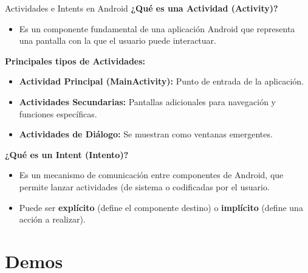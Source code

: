 \documentclass[aspectratio=169,compress]{beamer}
\begin{document}
\begin{frame}{Actividades e Intents en Android}
\textbf{¿Qué es una Actividad (Activity)?}

\begin{itemize}
    \item Es un componente fundamental de una aplicación Android que representa una pantalla con la que el usuario puede interactuar.
\end{itemize}

\vspace{0.4cm}

\textbf{Principales tipos de Actividades:}
\begin{itemize}
    \item \textbf{Actividad Principal (MainActivity):} Punto de entrada de la aplicación.
    \item \textbf{Actividades Secundarias:} Pantallas adicionales para navegación y funciones específicas.
    \item \textbf{Actividades de Diálogo:} Se muestran como ventanas emergentes.
\end{itemize}

\vspace{0.4cm}

\textbf{¿Qué es un Intent (Intento)?}
\begin{itemize}
    \item Es un mecanismo de comunicación entre componentes de Android, que permite lanzar actividades (de sistema o codificadas por el usuario.
    \item Puede ser \textbf{explícito} (define el componente destino) o \textbf{implícito} (define una acción a realizar).
\end{itemize}

\end{frame}




\section{Demos}















\end{document}
